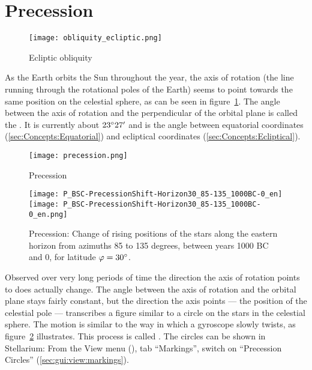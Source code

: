 \section{Precession}
\label{sec:Concepts:Precession}

\begin{figure}[htb]
\centering\texttt{[image: obliquity\_ecliptic.png]}
\caption{Ecliptic obliquity}
\label{fig:Obliquity}
\end{figure}

As the Earth orbits the Sun throughout the year, the axis of rotation
(the line running through the rotational poles of the Earth) seems to
point towards the same position on the celestial sphere, as can be
seen in figure~\ref{fig:Obliquity}. The angle between the axis of
rotation and the perpendicular of the orbital plane is called the
. It is currently about
$23\degree27'$ and is the angle between equatorial coordinates
(\ref{sec:Concepts:Equatorial}) and ecliptical coordinates
(\ref{sec:Concepts:Ecliptical}).

\begin{figure}[p]
\centering\texttt{[image: precession.png]}
\caption{Precession}
\label{fig:Precession}
\end{figure}

\begin{figure}[p]
\centering
\ifpdf
\texttt{[image: P\_BSC-PrecessionShift-Horizon30\_85-135\_1000BC-0\_en]}
\else
\texttt{[image: P\_BSC-PrecessionShift-Horizon30\_85-135\_1000BC-0\_en.png]}
\fi
\caption{Precession: Change of rising positions of the stars along the
  eastern horizon from azimuths 85 to 135 degrees, between years 1000
  BC and 0, for latitude $\varphi=30\degree$.}
\label{fig:Precession:AzimuthShift}
\end{figure}




Observed over very long periods of time the direction the axis of
rotation points to does actually change. The angle between the axis of
rotation and the orbital plane stays fairly constant, but the
direction the axis points --- the position of the celestial pole ---
transcribes a figure similar to a circle on the stars in the celestial sphere. The motion
is similar to the way in which a gyroscope slowly twists, as
figure~\ref{fig:Precession} illustrates. This process is called
. The circles can be shown in Stellarium: From
the View menu (), tab ``Markings'', switch on ``Precession
Circles'' (\ref{sec:gui:view:markings}).

